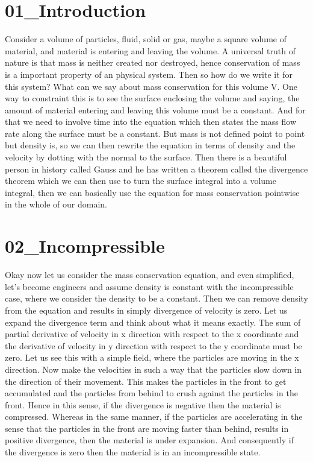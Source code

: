 \documentclass{article}
\begin{document}
\section*{01\_Introduction}
Consider a volume of particles, fluid, solid or gas, maybe a square volume of material, and material is entering and leaving the volume. A universal truth of nature is that mass is neither created nor destroyed, hence conservation of mass is a important property of an physical system. Then so how do we write it for this system? What can we say about mass conservation for this volume V. One way to constraint this is to see the surface enclosing the volume and saying, the amount of material entering and leaving this volume must be a constant. And for that we need to involve time into the equation which then states the mass flow rate along the surface must be a constant. But mass is not defined point to point but density is, so we can then rewrite the equation in terms of density and the velocity by dotting with the normal to the surface. Then there is a beautiful person in history called Gauss and he has written a theorem called the divergence theorem which we can then use to turn the surface integral into a volume integral, then we can basically use the equation for mass conservation pointwise in the whole of our domain.

\section*{02\_Incompressible}
Okay now let us consider the mass conservation equation, and even simplified, let's become engineers and assume density is constant with the incompressible case, where we consider the density to be a constant. Then we can remove density from the equation and results in simply divergence of velocity is zero. Let us expand the divergence term and think about what it means exactly. The sum of partial derivative of velocity in x direction with respect to the x coordinate and the derivative of velocity in y direction with respect to the y coordinate must be zero. Let us see this with a simple field, where the particles are moving in the x direction. Now make the velocities in such a way that the particles slow down in the direction of their movement. This makes the particles in the front to get accumulated and the particles from behind to crush against the particles in the front. Hence in this sense, if the divergence is negative then the material is compressed. Whereas in the same manner, if the particles are accelerating in the sense that the particles in the front are moving faster than behind, results in positive divergence, then the material is under expansion. And consequently if the divergence is zero then the material is in an incompressible state.
\end{document}

